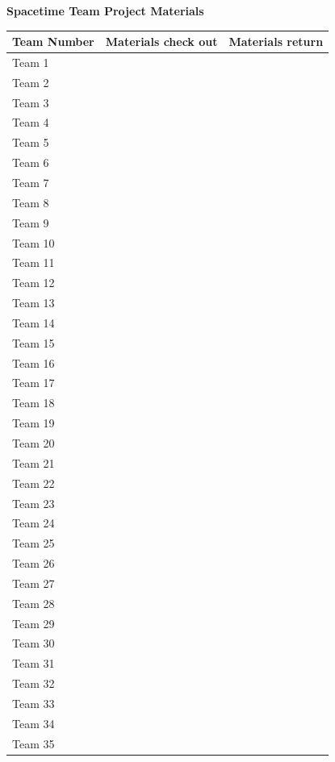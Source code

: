 \documentclass{article}
\begin{document}
\centering
\textbf{\Large{Spacetime Team Project Materials}}
\vspace{0.5cm}

\begin{tabularx}{\textwidth}{|X|X|X|}
    \hline
    \textbf{Team Number} & \textbf{Materials check out} & \textbf{Materials return} \\
    \hline
    Team 1 &  &  \\
    \hline
    Team 2 &  &  \\
    \hline
    Team 3 &  &  \\
    \hline
    Team 4 &  &  \\
    \hline
    Team 5 &  &  \\
    \hline
    Team 6 &  &  \\
    \hline
    Team 7 &  &  \\
    \hline
    Team 8 &  &  \\
    \hline
    Team 9 &  &  \\
    \hline
    Team 10 &  &  \\
    \hline
    Team 11 &  &  \\
    \hline
    Team 12 &  &  \\
    \hline
    Team 13 &  &  \\
    \hline
    Team 14 &  &  \\
    \hline
    Team 15 &  &  \\
    \hline
    Team 16 &  &  \\
    \hline
    Team 17 &  &  \\
    \hline
    Team 18 &  &  \\
    \hline
    Team 19 &  &  \\
    \hline
    Team 20 &  &  \\
    \hline
    Team 21 &  &  \\
    \hline
    Team 22 &  &  \\
    \hline
    Team 23 &  &  \\
    \hline
    Team 24 &  &  \\
    \hline
    Team 25 &  &  \\
    \hline
    Team 26 &  &  \\
    \hline
    Team 27 &  &  \\
    \hline
    Team 28 &  &  \\
    \hline
    Team 29 &  &  \\
    \hline
    Team 30 &  &  \\
    \hline
    Team 31 &  &  \\
    \hline
    Team 32 &  &  \\
    \hline
    Team 33 &  &  \\
    \hline
    Team 34 &  &  \\
    \hline
    Team 35 &  &  \\
    \hline
\end{tabularx}
\end{document}
